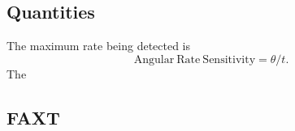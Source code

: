\documentclass[10pt]{article}
\begin{document}
\subsection{Quantities}
	The maximum rate being detected is 
\begin{equation}
	\mathrm{Angular\ Rate\ Sensitivity} = \theta / t.
\end{equation}
The 

\subsection{FAXT}
\end{document}
